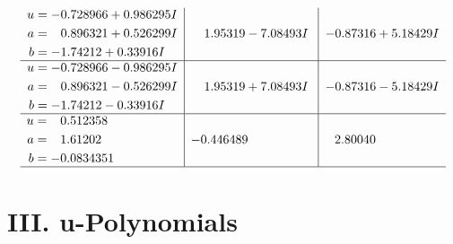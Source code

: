 \documentclass[1p]{elsarticle_modified}
\theoremstyle{definition}
\begin{document}
$$\begin{array}{c|c|c}
\begin{aligned}
u &= -0.728966 + 0.986295 I \\
a &= \phantom{-}0.896321 + 0.526299 I \\
b &= -1.74212 + 0.33916 I\end{aligned}
 & \phantom{-}1.95319 - 7.08493 I & -0.87316 + 5.18429 I \\ \hline\begin{aligned}
u &= -0.728966 - 0.986295 I \\
a &= \phantom{-}0.896321 - 0.526299 I \\
b &= -1.74212 - 0.33916 I\end{aligned}
 & \phantom{-}1.95319 + 7.08493 I & -0.87316 - 5.18429 I \\ \hline\begin{aligned}
u &= \phantom{-}0.512358\phantom{ +0.000000I} \\
a &= \phantom{-}1.61202\phantom{ +0.000000I} \\
b &= -0.0834351\phantom{ +0.000000I}\end{aligned}
 & -0.446489\phantom{ +0.000000I} & \phantom{-}2.80040\phantom{ +0.000000I}\\
 \hline 
 \end{array}$$\newpage
\newpage\renewcommand{\arraystretch}{1}
\centering \section*{ III. u-Polynomials}
\end{document}
